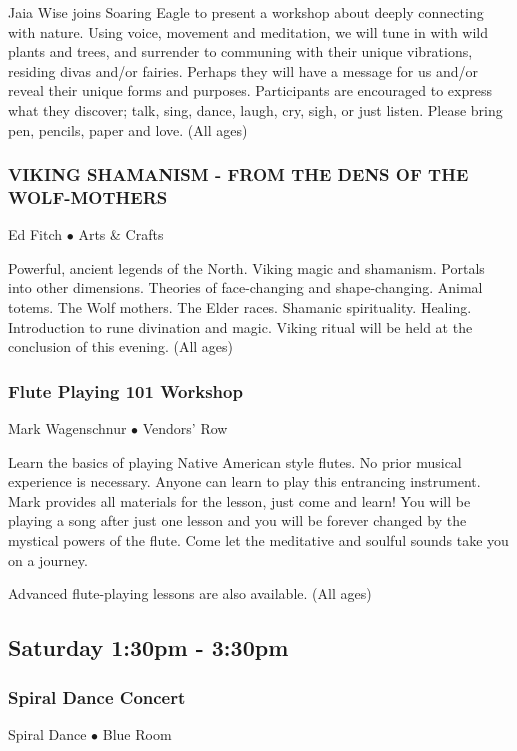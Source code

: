  Jaia Wise joins Soaring Eagle to present a workshop about deeply connecting with nature. Using voice, movement and meditation, we will tune in with wild plants and trees, and surrender to communing with their unique vibrations, residing divas and/or fairies. Perhaps they will have a message for us and/or reveal their unique forms and purposes. Participants are encouraged to express what they discover; talk, sing, dance, laugh, cry, sigh, or just listen. Please bring pen, pencils, paper and love. {\small (All ages)}

\subsubsection{VIKING SHAMANISM - FROM THE DENS OF THE WOLF-MOTHERS}
\label{Sat-Fitch1}
{\small Ed Fitch $\bullet$  Arts \& Crafts}

 Powerful, ancient legends of the North.  Viking magic and shamanism.  Portals into other dimensions.  Theories of face-changing and shape-changing.  Animal totems.  The Wolf mothers. The Elder races.  Shamanic spirituality.  Healing.  Introduction to rune divination and magic.  Viking ritual will be held at the conclusion of this evening. {\small (All ages)}

\subsubsection{Flute Playing 101 Workshop}
\label{Sat-Mark2}
{\small Mark Wagenschnur $\bullet$  Vendors' Row}

 Learn the basics of playing Native American style flutes.  No prior musical experience is necessary.  Anyone can learn to play this entrancing instrument.  Mark provides all materials for the lesson, just come and learn!   You will be playing a song after just one lesson and you will be forever changed by the mystical powers of the flute.  Come let the meditative and soulful sounds take you on a journey.

Advanced flute-playing lessons are also available. {\small (All ages)}

\subsection{Saturday 1:30pm - 3:30pm}

\subsubsection{Spiral Dance Concert}
\label{Sat-Concert2}
{\small Spiral Dance $\bullet$  Blue Room}

